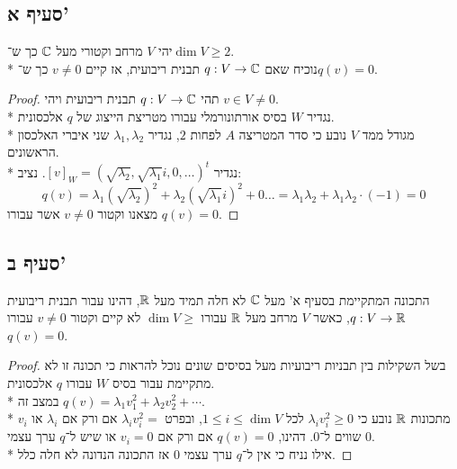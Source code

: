 \subsection{סעיף א'}
יהי $V$ מרחב וקטורי מעל $\mathbb{C}$ כך ש־$\dim V \ge 2$. \\*
נוכיח שאם $q: V \to \mathbb{C}$ תבנית ריבועית, אז קיים $v \ne 0$ כך ש־$q(v) = 0$.
\begin{proof}
	תהי $q : V \to \mathbb{C}$ תבנית ריבועית ויהי $v \in V \ne 0$. \\*
	נגדיר $W$ בסיס אורתונורמלי עבורו מטריצת הייצוג של $q$ אלכסונית. \\*
	מגודל ממד $V$ נובע כי סדר המטריצה $A$ לפחות $2$, נגדיר $\lambda_1, \lambda_2$ שני איברי האלכסון הראשונים. \\*
	נגדיר ${[v]}_W = {(\sqrt{\lambda_2}, \sqrt{\lambda_1}i, 0, \hdots)}^t$.
	נציב:
	\[
		q(v) = \lambda_1 {\left(\sqrt{\lambda_2}\right)}^2 + \lambda_2 {\left( \sqrt{\lambda_1} i\right)}^2 + 0 \hdots
		= \lambda_1 \lambda_2 + \lambda_1 \lambda_2 \cdot (-1)
		= 0
	\]
	מצאנו וקטור $v \ne 0$ אשר עבורו $q(v) = 0$.
\end{proof}

\subsection{סעיף ב'}
התכונה המתקיימת בסעיף א' מעל $\mathbb{C}$ לא חלה תמיד מעל $\mathbb{R}$,
דהינו עבור תבנית ריבועית $q : V \to \mathbb{R}$, כאשר $V$ מרחב מעל $\mathbb{R}$ עבורו $\dim V \ge $ לא קיים וקטור $v \ne 0$ עבורו $q(v) = 0$.
\begin{proof}
	בשל השקילות בין תבניות ריבועיות מעל בסיסים שונים נוכל להראות כי תכונה זו לא מתקיימת עבור בסיס $W$ עבורו $q$ אלכסונית. \\*
	במצב זה $q(v) = \lambda_1 v_1^2 + \lambda_2 v_2^2 + \cdots$. \\*
	מתכונות $\mathbb{R}$ נובע כי $\lambda_i v_i^2 \ge 0$ לכל $1 \le i \le \dim V$,
	ובפרט $\lambda_i v_i^2 = $ אם ורק אם $\lambda_i$ או $v_i$ שווים ל־$0$.
	דהינו, $q(v) = 0$ אם ורק אם $v_i = 0$ או שיש ל־$q$ ערך עצמי $0$. \\*
	אילו נניח כי אין ל־$q$ ערך עצמי $0$ אז התכונה הנדונה לא חלה כלל.
\end{proof}

